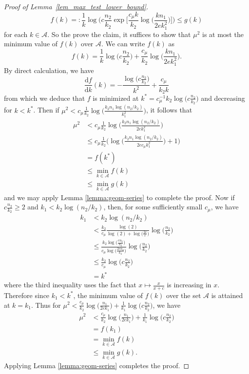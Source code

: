 \documentclass{article}
\newcommand{\D}{\textrm{d}}
\newcommand{\cA}{\mathcal{A}}
\begin{document}
\begin{proof}[Proof of Lemma~\ref{lem_max_test_lower_bound}]
    \[f(k) =: \frac{1}{k}\log\Bigg(c\frac{n_2}{k_2}\exp\Big[\frac{c_\mu k}{k_2}\log\big(\frac{kn_1}{2ek_1^2}\big)\Big]\Bigg) \leq g(k)\]
    for each $k \in \cA$. So the prove the claim, it suffices to show that $\mu^2$ is at most the minimum value of $f(k)$ over $\cA$. We can write $f(k)$ as 
    \[f(k) = \frac{1}{k}\log\Big(c\frac{n_2}{k_2}\Big) + \frac{c_\mu}{k_2}\log\Big(\frac{kn_1}{2ek_1^2}\Big).\]
    By direct calculation, we have
    \[\frac{\D f}{\D k}(k) = -\frac{\log\big(c\frac{n_2}{k_2}\big)}{k^2} + \frac{c_\mu}{k_2k}\]
    from which we deduce that $f$ is minimized at $k^* = c_\mu^{-1}k_2\log\big(c\frac{n_2}{k_2}\big)$ and decreasing for $k < k^*$. Then if $\mu^2 < c_\mu\frac{1}{k_2}\log\big(\frac{k_2n_1\log(n_2/k_2)}{k_1^2}\big)$, it follows that 
    \begin{align*}
        \mu^2 &< c_\mu\frac{1}{k_2}\log\big(\frac{k_2n_1\log(n_2/k_2)}{2ek_1^2}\big) \\
        &\leq c_\mu\frac{1}{k_2}\Big(\log\big(\frac{k_2n_1\log(n_2/k_2)}{2e c_\mu k_1^2}\big) + 1\Big) \\
        &= f(k^*) \\
        &\leq \min_{k \in \cA}f(k) \\
        &\leq \min_{k\in \cA}g(k)
    \end{align*}
    and we may apply Lemma \ref{lemma:geom-series} to complete the proof. Now if $c\frac{n_2}{k_2} \geq 2$ and $k_1 < k_2\log(n_2/k_2)$, then, for some sufficiently small $c_\mu$, we have
    \begin{align*}
        k_1 &< k_2\log(n_2/k_2) \\
        &< \frac{k_2}{c_\mu}\frac{\log (2)}{\log (2) + \log \big(\frac{2e}{c}\big)}\log\big(\frac{n_2}{k_2}\big) \\
        &\leq \frac{k_2\log\big(\frac{cn_2}{k_2}\big)}{c_\mu\log\big(\frac{2en_2}{k_2}\big)}\log\big(\frac{n_2}{k_2}\big) \\
        &\leq \frac{k_2}{c_\mu}\log\big(c\frac{n_2}{k_2}\big) \\
        &= k^*
    \end{align*}
    where the third inequality uses the fact that $x \mapsto \frac{x}{x + c}$ is increasing in $x$. Therefore since $k_1 < k^*$, the minimum value of $f(k)$ over the set $\cA$ is attained at $k = k_1$. Thus for $\mu^2 < \frac{c_\mu}{k_2}\log\big(\frac{n_1}{2ek_1}\big) + \frac{1}{k_1}\log\big(c\frac{n_2}{k_2}\big)$, we have 
    \begin{align*}
        \mu^2 &< \frac{c_\mu}{k_2}\log\big(\frac{n_1}{2ek_1}\big) + \frac{1}{k_1}\log\big(c\frac{n_2}{k_2}\big) \\ 
        &= f(k_1) \\
        &= \min_{k \in \cA}f(k) \\
        &\leq \min_{k\in \cA}g(k).
    \end{align*}
    Applying Lemma \ref{lemma:geom-series} completes the proof.    
\end{proof}
\end{document}
